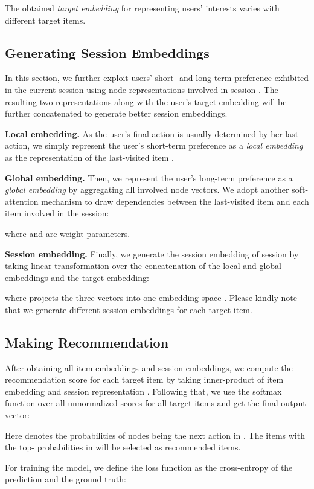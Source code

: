 \documentclass[sigconf]{acmart}
\begin{document}
The obtained \emph{target embedding} for representing users' interests varies with different target items.

\subsection{Generating Session Embeddings}

In this section, we further exploit users' short- and long-term preference exhibited in the current session  using node representations involved in session . The resulting two representations along with the user's target embedding will be further concatenated to generate better session embeddings.

\textbf{Local embedding.}
As the user's final action is usually determined by her last action, we simply represent the user's short-term preference as a \emph{local embedding}  as the representation of the last-visited item .

\textbf{Global embedding.}
Then, we represent the user's long-term preference as a \emph{global embedding}  by aggregating all involved node vectors. We adopt another soft-attention mechanism to draw dependencies between the last-visited item and each item involved in the session:

where  and  are weight parameters.

\textbf{Session embedding.}
Finally, we generate the session embedding  of session  by taking linear transformation over the concatenation of the local and global embeddings and the target embedding:

where  projects the three vectors into one embedding space . Please kindly note that we generate different session embeddings for each target item.

\subsection{Making Recommendation}
After obtaining all item embeddings and session embeddings, we compute the recommendation score  for each target item  by taking inner-product of item embedding  and session representation . Following that, we use the softmax function over all unnormalized scores  for all target items and get the final output vector:

Here  denotes the probabilities of nodes being the next action in . The items with the top- probabilities in  will be selected as recommended items.

For training the model, we define the loss function as the cross-entropy of the prediction and the ground truth:
\end{document}
